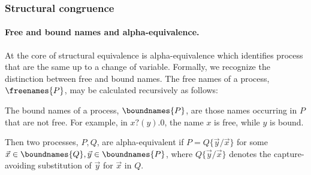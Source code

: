 
\subsubsection{Structural congruence}

\paragraph{Free and bound names and alpha-equivalence.} At the
core of structural equivalence is alpha-equivalence which identifies
process that are the same up to a change of variable. Formally, we
recognize the distinction between free and bound names. The free names
of a process, $\freenames{P}$, may be calculated recursively as
follows:


The bound names of a process, $\boundnames{P}$, are those names occurring in $P$
that are not free. For example, in $x?(y).0$, the name $x$ is free, while $y$ is bound.

\begin{definition}
Then two processes, $P,Q$, are alpha-equivalent if $P = Q\{\vec{y}/\vec{x}\}$ for
some $\vec{x} \in \boundnames{Q},\vec{y} \in \boundnames{P}$, where $Q\{\vec{y}/\vec{x}\}$
denotes the capture-avoiding substitution of $\vec{y}$ for $\vec{x}$ in $Q$.
\end{definition}

